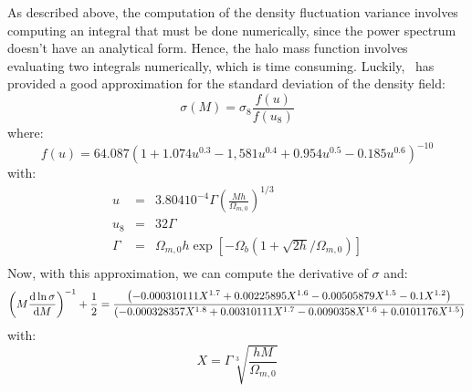 As described above, the computation of the density fluctuation variance
involves computing an integral that must be done numerically, since the power
spectrum doesn't have an analytical form. Hence, the halo mass function
involves evaluating two integrals numerically, which is time consuming.
Luckily,~\cite{vandenBosch+02} has provided a good approximation for the
standard deviation of the density field:
%
\begin{equation}
    \sigma\left(M\right)=\sigma_8\frac{f\left(u\right)}{f\left(u_8\right)}
\end{equation}
%
where:
%
\begin{equation}
    f\left(u\right)=
    64.087 {\left(1 + 1.074 u^{0.3} - 1,581 u^{0.4} +
        0.954 u^{0.5} - 0.185 u^{0.6}\right)}^{-10}
\end{equation}
%
with:
%
\begin{eqnarray}
    u & = & 3.804 10^{-4}\Gamma{\left(\frac{Mh}{\Omega_{m,0}}\right)}^{1/3}
        \nonumber\\
    u_8 & = & 32\Gamma\nonumber\\
    \Gamma & = &
        \Omega_{m,0}h\exp
        \left[-\Omega_b\left(1+\sqrt{2h}/\Omega_{m,0}\right)\right]\nonumber\\
\end{eqnarray}
%
Now, with this approximation, we can compute the derivative of
$\sigma$ and:
%
\begin{equation}
    {\left(M\frac{{\rm{d}}\ln\sigma}{{\rm{d}}M}\right)}^{-1}+\frac{1}{2} =
    \frac{\left(-0.000310111 X^{1.7} + 0.00225895 X^{1.6} -
        0.00505879 X^{1.5} - 0.1 X^{1.2}\right)}
        {\left(-0.000328357 X^{1.8} + 0.00310111 X^{1.7} -
        0.0090358 X^{1.6} + 0.0101176 X^{1.5}\right)}
\end{equation}
%
with:
%
\begin{equation}
    X=\Gamma
    \sqrt[3]{\frac{h M}{\Omega _{m,0}}}
\end{equation}
%

